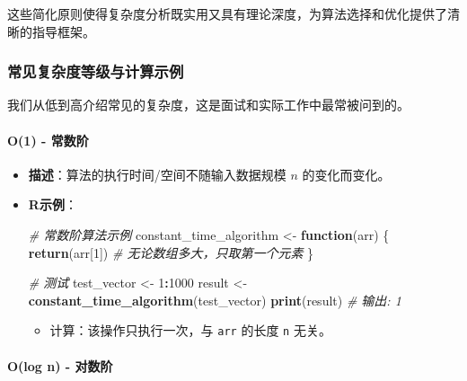 \documentclass[
  twoside]{book}
\newenvironment{Shaded}{\begin{snugshade}}{\end{snugshade}}
\newcommand{\CommentTok}[1]{\textcolor[rgb]{0.56,0.35,0.01}{\textit{#1}}}
\newcommand{\ControlFlowTok}[1]{\textcolor[rgb]{0.13,0.29,0.53}{\textbf{#1}}}
\newcommand{\DecValTok}[1]{\textcolor[rgb]{0.00,0.00,0.81}{#1}}
\newcommand{\FunctionTok}[1]{\textcolor[rgb]{0.13,0.29,0.53}{\textbf{#1}}}
\newcommand{\NormalTok}[1]{#1}
\newcommand{\OtherTok}[1]{\textcolor[rgb]{0.56,0.35,0.01}{#1}}
\newcommand{\SpecialCharTok}[1]{\textcolor[rgb]{0.81,0.36,0.00}{\textbf{#1}}}
\providecommand{\tightlist}{%
  \setlength{\itemsep}{0pt}\setlength{\parskip}{0pt}}
\begin{document}
这些简化原则使得复杂度分析既实用又具有理论深度，为算法选择和优化提供了清晰的指导框架。

\hypertarget{ux5e38ux89c1ux590dux6742ux5ea6ux7b49ux7ea7ux4e0eux8ba1ux7b97ux793aux4f8b}{%
\subsubsection{常见复杂度等级与计算示例}\label{ux5e38ux89c1ux590dux6742ux5ea6ux7b49ux7ea7ux4e0eux8ba1ux7b97ux793aux4f8b}}

我们从低到高介绍常见的复杂度，这是面试和实际工作中最常被问到的。

\hypertarget{o1---ux5e38ux6570ux9636}{%
\paragraph{O(1) - 常数阶}\label{o1---ux5e38ux6570ux9636}}

\begin{itemize}
\item
  \textbf{描述}：算法的执行时间/空间不随输入数据规模 \(n\) 的变化而变化。
\item
  \textbf{R示例}：

\begin{Shaded}
\begin{Highlighting}[]
\CommentTok{\# 常数阶算法示例}
\NormalTok{constant\_time\_algorithm }\OtherTok{\textless{}{-}} \ControlFlowTok{function}\NormalTok{(arr) \{}
  \FunctionTok{return}\NormalTok{(arr[}\DecValTok{1}\NormalTok{])  }\CommentTok{\# 无论数组多大，只取第一个元素}
\NormalTok{\}}

\CommentTok{\# 测试}
\NormalTok{test\_vector }\OtherTok{\textless{}{-}} \DecValTok{1}\SpecialCharTok{:}\DecValTok{1000}
\NormalTok{result }\OtherTok{\textless{}{-}} \FunctionTok{constant\_time\_algorithm}\NormalTok{(test\_vector)}
\FunctionTok{print}\NormalTok{(result)  }\CommentTok{\# 输出: 1}
\end{Highlighting}
\end{Shaded}

  \begin{itemize}
  \tightlist
  \item
    计算：该操作只执行一次，与 \texttt{arr} 的长度 \texttt{n} 无关。
  \end{itemize}
\end{itemize}

\hypertarget{olog-n---ux5bf9ux6570ux9636}{%
\paragraph{O(log n) - 对数阶}\label{olog-n---ux5bf9ux6570ux9636}}
\end{document}
